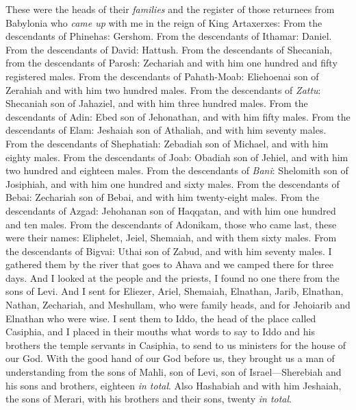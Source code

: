 \begin{biblechapter} %
 These were the heads of their \textit{families} and the register of those returnees from Babylonia who \textit{came up} with me in the reign of King Artaxerxes:
\verse From the descendants of Phinehas: Gershom. From the descendants of Ithamar: Daniel. From the descendants of David: Hattush.
\verse From the descendants of Shecaniah, from the descendants of Parosh: Zechariah and with him one hundred and fifty registered males.
\verse From the descendants of Pahath-Moab: Eliehoenai son of Zerahiah and with him two hundred males.
\verse From the descendants of \textit{Zattu}: Shecaniah son of Jahaziel, and with him three hundred males.
\verse From the descendants of Adin: Ebed son of Jehonathan, and with him fifty males.
\verse From the descendants of Elam: Jeshaiah son of Athaliah, and with him seventy males.
\verse From the descendants of Shephatiah: Zebadiah son of Michael, and with him eighty males.
\verse From the descendants of Joab: Obadiah son of Jehiel, and with him two hundred and eighteen males.
\verse From the descendants of \textit{Bani}: Shelomith son of Josiphiah, and with him one hundred and sixty males.
\verse From the descendants of Bebai: Zechariah son of Bebai, and with him twenty-eight males.
\verse From the descendants of Azgad: Jehohanan son of Haqqatan, and with him one hundred and ten males.
\verse From the descendants of Adonikam, those who came last, these were their names: Eliphelet, Jeiel, Shemaiah, and with them sixty males.
\verse From the descendants of Bigvai: Uthai son of Zabud, and with him seventy males.
 I gathered them by the river that goes to Ahava and we camped there for three days. And I looked at the people and the priests, I found no one there from the sons of Levi.
\verse And I sent for Eliezer, Ariel, Shemaiah, Elnathan, Jarib, Elnathan, Nathan, Zechariah, and Meshullam, who were family heads, and for Jehoiarib and Elnathan who were wise.
\verse I sent them to Iddo, the head of the place called Casiphia, and I placed in their mouths what words to say to Iddo and his brothers the temple servants in Casiphia, to send to us ministers for the house of our God.
\verse With the good hand of our God before us, they brought us a man of understanding from the sons of Mahli, son of Levi, son of Israel—Sherebiah and his sons and brothers, eighteen \textit{in total}.
\verse Also Hashabiah and with him Jeshaiah, the sons of Merari, with his brothers and their sons, twenty \textit{in total}.

\end{biblechapter}
